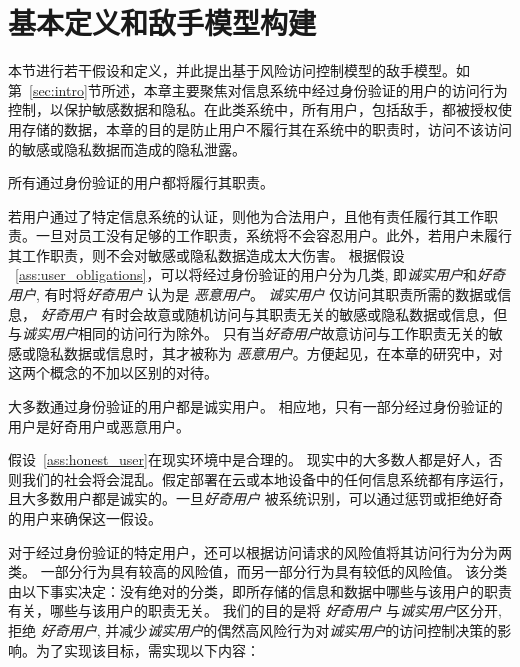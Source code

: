 \section{基本定义和敌手模型构建}
\label{sec:adversary_model}

本节进行若干假设和定义，并此提出基于风险访问控制模型的敌手模型。如第~\ref{sec:intro}节所述，本章主要聚焦对信息系统中经过身份验证的用户的访问行为控制，以保护敏感数据和隐私。在此类系统中，所有用户，包括敌手，都被授权使用存储的数据，本章的目的是防止用户不履行其在系统中的职责时，访问不该访问的敏感或隐私数据而造成的隐私泄露。

\begin{assumption}
	\label{ass:user_obligations}
	所有通过身份验证的用户都将履行其职责。
\end{assumption}

若用户通过了特定信息系统的认证，则他为合法用户，且他有责任履行其工作职责。一旦对员工没有足够的工作职责，系统将不会容忍用户。此外，若用户未履行其工作职责，则不会对敏感或隐私数据造成太大伤害。 根据假设 ~\ref{ass:user_obligations}，可以将经过身份验证的用户分为几类, 即\emph{诚实用户}和\emph{好奇用户}, 有时将\emph{好奇用户} 认为是 \emph{恶意用户}。 \emph{诚实用户} 仅访问其职责所需的数据或信息，  \emph{好奇用户} 有时会故意或随机访问与其职责无关的敏感或隐私数据或信息，但与\emph{诚实用户}相同的访问行为除外。 只有当\emph{好奇用户}故意访问与工作职责无关的敏感或隐私数据或信息时，其才被称为 \emph{恶意用户}。方便起见，在本章的研究中，对这两个概念的不加以区别的对待。

\begin{assumption}
	\label{ass:honest_user}
	大多数通过身份验证的用户都是诚实用户。 相应地，只有一部分经过身份验证的用户是好奇用户或恶意用户。
\end{assumption}

假设~\ref{ass:honest_user}在现实环境中是合理的。 现实中的大多数人都是好人，否则我们的社会将会混乱。假定部署在云或本地设备中的任何信息系统都有序运行，且大多数用户都是诚实的。一旦\emph{好奇用户} 被系统识别，可以通过惩罚或拒绝好奇的用户来确保这一假设。

对于经过身份验证的特定用户，还可以根据访问请求的风险值将其访问行为分为两类。 一部分行为具有较高的风险值，而另一部分行为具有较低的风险值。 该分类由以下事实决定：没有绝对的分类，即所存储的信息和数据中哪些与该用户的职责有关，哪些与该用户的职责无关。 我们的目的是将 \emph{好奇用户} 与\emph{诚实用户}区分开, 拒绝 \emph{好奇用户}, 并减少\emph{诚实用户}的偶然高风险行为对\emph{诚实用户}的访问控制决策的影响。为了实现该目标，需实现以下内容：


